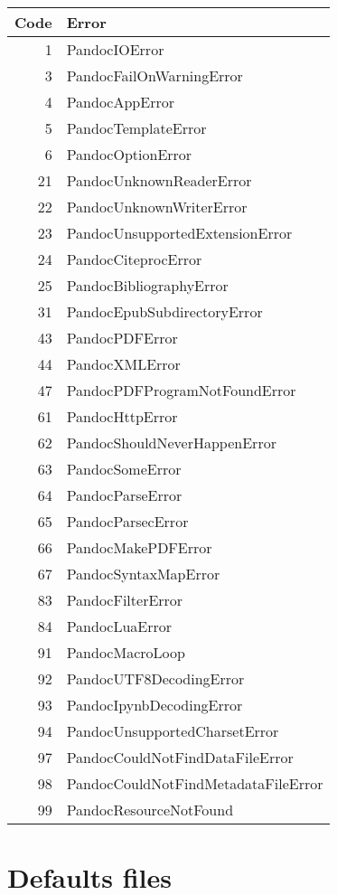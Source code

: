 \documentclass[
]{article}
\begin{document}
\begin{longtable}[]{@{}rl@{}}
\toprule()
Code & Error \\
\midrule()
\endhead
1 & PandocIOError \\
3 & PandocFailOnWarningError \\
4 & PandocAppError \\
5 & PandocTemplateError \\
6 & PandocOptionError \\
21 & PandocUnknownReaderError \\
22 & PandocUnknownWriterError \\
23 & PandocUnsupportedExtensionError \\
24 & PandocCiteprocError \\
25 & PandocBibliographyError \\
31 & PandocEpubSubdirectoryError \\
43 & PandocPDFError \\
44 & PandocXMLError \\
47 & PandocPDFProgramNotFoundError \\
61 & PandocHttpError \\
62 & PandocShouldNeverHappenError \\
63 & PandocSomeError \\
64 & PandocParseError \\
65 & PandocParsecError \\
66 & PandocMakePDFError \\
67 & PandocSyntaxMapError \\
83 & PandocFilterError \\
84 & PandocLuaError \\
91 & PandocMacroLoop \\
92 & PandocUTF8DecodingError \\
93 & PandocIpynbDecodingError \\
94 & PandocUnsupportedCharsetError \\
97 & PandocCouldNotFindDataFileError \\
98 & PandocCouldNotFindMetadataFileError \\
99 & PandocResourceNotFound \\
\bottomrule()
\end{longtable}

\hypertarget{defaults-files}{%
\section{Defaults files}\label{defaults-files}}
\end{document}
